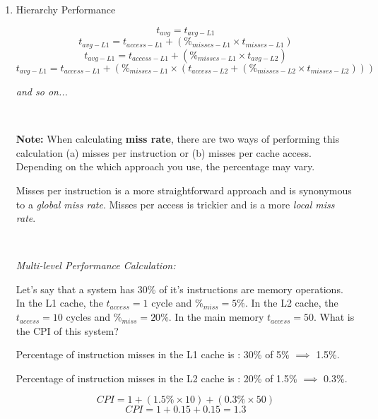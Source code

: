 \documentclass[12pt]{article}
\newenvironment{QandA}{\begin{enumerate}[label=\bfseries\arabic*.]\bfseries}
                      {\end{enumerate}}
\newenvironment{answered}{\par\quad\normalfont}{}
\begin{document}
\begin{QandA}
\begin{answered}
\textit{Design Choice \#2:} \textbf{Inclusive} Memory or \textbf{Exclusive} Memory. In an \textit{Inclusive} design, a block in L1 is always in L2. In an \textit{Exclusive} design, a block is either in L1 or L2, never in both.
\end{answered}

\ 

\item Hierarchy Performance
\begin{answered}
\begin{equation*}
    t_{avg} = t_{avg-L1}
\end{equation*}
\begin{equation*}
    t_{avg-L1} = t_{access-L1} + (\%_{misses-L1} \times t_{misses-L1})
\end{equation*}
\begin{equation*}
    t_{avg-L1} = t_{access-L1} + (\%_{misses-L1} \times t_{avg-L2})
\end{equation*}
\begin{equation*}
    t_{avg-L1} = t_{access-L1} + (\%_{misses-L1} \times (t_{access-L2} + (\%_{misses-L2} \times t_{misses-L2})))
\end{equation*}

\textit{and so on...}

\ 

\textbf{Note:} When calculating \textbf{miss rate}, there are two ways of performing this calculation (a) misses per instruction or (b) misses per cache access. Depending on the which approach you use, the percentage may vary. 

Misses per instruction is a more straightforward approach and is synonymous to a \textit{global miss rate}. Misses per access is trickier and is a more \textit{local miss rate}. 

\ 

\textit{Multi-level Performance Calculation:}

Let's say that a system has 30\% of it's instructions are memory operations. In the L1 cache, the $t_{access}=1$ cycle and $\%_{miss}=5\%$. In the L2 cache, the $t_{access}=10$ cycles and $\%_{miss}=20\%$. In the main memory $t_{access}=50$. What is the CPI of this system?

Percentage of instruction misses in the L1 cache is : 30\% of 5\% $\implies$ 1.5\%.

Percentage of instruction misses in the L2 cache is : 20\% of 1.5\% $\implies$ 0.3\%.

\begin{equation*}
    CPI = 1 + (1.5\% \times 10) + (0.3\% \times 50)
\end{equation*}
\begin{equation*}
    CPI = 1 + 0.15 + 0.15 = 1.3
\end{equation*}
\end{answered}
\end{QandA}
\end{document}
